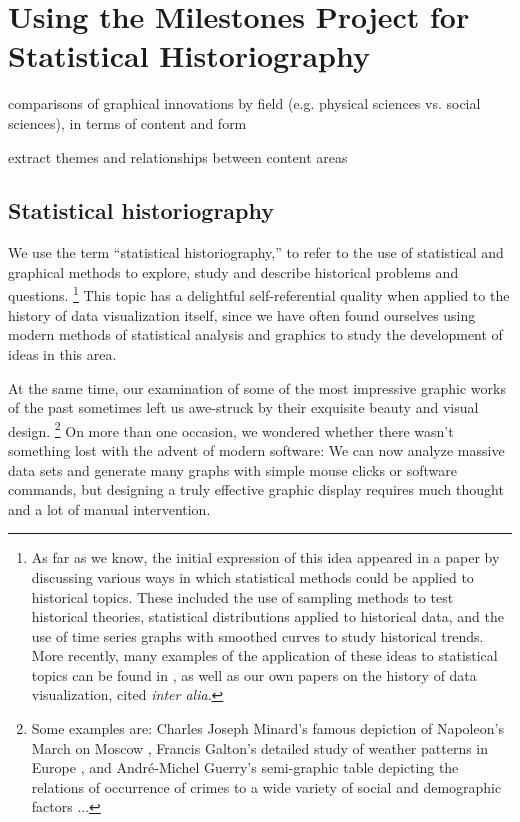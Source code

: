 \documentclass[11pt]{article}
\begin{document}
\section{Using the Milestones Project for Statistical Historiography}\label{sec:historiography}
\begin{itemize*}
  \item comparisons of graphical innovations by field (e.g. physical sciences vs. social sciences), in terms of content and form
  \item extract themes and relationships between content areas
\end{itemize*}

\subsection{Statistical historiography}\label{sec:stathist}
We use the term ``statistical historiography,''
to refer to the use of statistical and graphical methods to
explore, study and describe historical problems and questions.%
\footnote{As far as we know, the initial expression of this idea appeared in a paper by
\citet{Rubin:1943} discussing various ways in which statistical methods could be applied
to historical topics.  These included the use of sampling methods to test historical theories,
statistical distributions applied to historical data, and the use of
time series graphs with smoothed curves to study historical trends.
More recently, many examples of the application of these ideas to statistical topics
can be found in \citet{Stigler:1986,Stigler:1999}, as well as our own papers
on the history of data visualization,
cited \emph{inter alia}.
}
This topic has a delightful self-referential quality when applied to the history of data visualization itself,
since we have often found ourselves using modern methods of statistical analysis and graphics to study
the development of ideas in this area.

At the same time, our examination of some of the most
impressive graphic works of the past sometimes left us awe-struck by their exquisite
beauty and visual design.%
\footnote{ Some examples are:
Charles Joseph Minard's famous depiction of Napoleon's March on Moscow \citep{Friendly:02:Minard},
Francis Galton's detailed study of weather patterns in Europe \citep[see:][]{Friendly:2008:golden},
and Andr{\'e}-Michel Guerry's \citep[Plate 17]{Guerry:1864}
semi-graphic table depicting the relations of occurrence of
crimes to a wide variety of social and demographic factors \citep[see:][]{Friendly:2007:guerry}
...
}
On more than one occasion, we wondered whether there wasn't something lost with the advent of modern
software: We can now analyze massive data sets and generate many graphs with simple mouse clicks
or software commands, but designing a truly effective graphic display requires much thought and
a lot of manual intervention.
\end{document}
